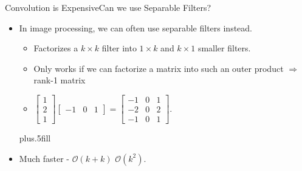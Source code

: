 \documentclass[t,xcolor=dvipsnames]{beamer}
\begin{document}
\begin{frame}{Convolution is Expensive}{Can we use Separable Filters?}
\begin{itemize}
    \item In image processing, we can often use separable filters instead.
    \begin{itemize}
        \item Factorizes a $k\times k$ filter into $1\times k$ and $k \times 1$ smaller filters.
        \item Only works if we can factorize a matrix into such an outer product $\Rightarrow$ rank-1 matrix    \item \eg $\begin{bmatrix} 1 \\ 2 \\ 1\end{bmatrix} \begin{bmatrix} -1 & 0 & 1\end{bmatrix}  = \begin{bmatrix} -1 & 0 & 1 \\ -2 & 0 & 2 \\ -1 & 0 & 1\end{bmatrix}$.
    \end{itemize}
    
    \vskip0pt plus.5fill
    \item Much faster - $\mathcal{O}(k+k)$ \vs $\mathcal{O}(k^2)$.
\end{itemize}
\end{frame}
\end{document}
